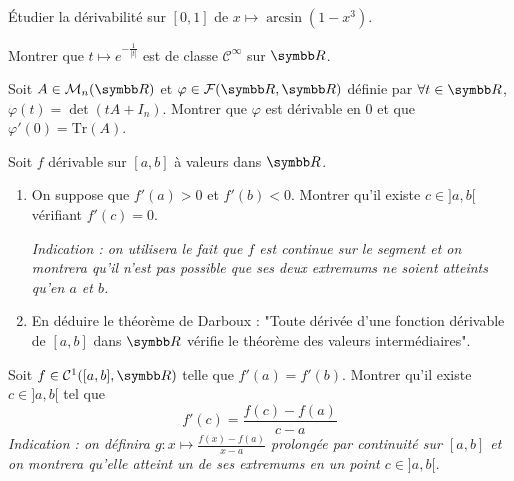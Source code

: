 \begin{exercice}
    Étudier la dérivabilité sur $[0, 1]$ de $x\mapsto \arcsin(1-x^{3})$.
\end{exercice}

\begin{exercice}
    Montrer que $t\mapsto e^{-\frac{1}{|t|}}$ est de classe $\mathcal{C}^{\infty}$ sur $\R$.
\end{exercice}

\begin{exercice}
    Soit $A\in \mathcal{M}_{n}(\R)$ et $\varphi\in \mathcal{F}(\R,\R)$ définie par $\forall t\in\R$, $\varphi(t)=\det(tA+I_{n})$.
    Montrer que $\varphi$ est dérivable en 0 et que $\varphi'(0)=\text{Tr}(A)$.
\end{exercice}

\begin{exercice}
    Soit $f$ dérivable sur $[a, b]$ à valeurs dans $\R$.
    \begin{enumerate}
        \item On suppose que $f'(a)>0$ et $f'(b)<0$.
            Montrer qu'il existe $c\in]a,b[$ vérifiant $f'(c)=0$.

        \textit{Indication : on utilisera le fait que $f$ est continue sur le segment et on montrera qu'il n'est pas possible que ses deux extremums ne soient atteints qu'en $a$ et $b$.}
    \item En déduire le théorème de Darboux : "Toute dérivée d'une fonction dérivable de $[a, b]$ dans $\R$ vérifie le théorème des valeurs intermédiaires".
\end{enumerate}
\end{exercice}

\begin{exercice}
    Soit $f\in \mathcal{C}^{1}([a,b],\R)$ telle que $f'(a)=f'(b)$.
    Montrer qu'il existe $c\in]a,b[$ tel que
    \[f'(c)=\frac{f(c)-f(a)}{c-a}\]
    \textit{Indication : on définira $g:x\mapsto\frac{f(x)-f(a)}{x-a}$ prolongée par continuité sur $[a, b]$ et on montrera qu'elle atteint un de ses extremums en un point $c\in]a,b[$.}
\end{exercice}

